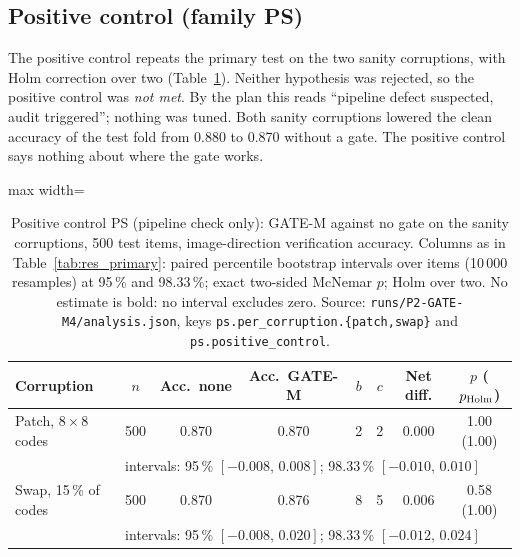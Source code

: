 \subsection{Positive control (family PS)}\label{ssec:res_ps}
The positive control repeats the primary test on the two sanity corruptions, with Holm correction over two (Table~\ref{tab:res_ps}).
Neither hypothesis was rejected, so the positive control was \emph{not met}.
By the plan this reads ``pipeline defect suspected, audit triggered''; nothing was tuned.
Both sanity corruptions lowered the clean accuracy of the test fold from 0.880 to 0.870 without a gate.
The positive control says nothing about where the gate works.

\begin{table}[!tbp]
\centering
\caption{Positive control PS (pipeline check only): GATE-M against no gate on the sanity corruptions, 500 test items, image-direction
verification accuracy. Columns as in Table~\ref{tab:res_primary}: paired percentile bootstrap intervals over items (10\,000
resamples) at 95\,\% and 98.33\,\%; exact two-sided McNemar $p$; Holm over two. No estimate is bold: no interval excludes zero. Source:
\nolinkurl{runs/P2-GATE-M4/analysis.json}, keys \nolinkurl{ps.per_corruption.{patch,swap}} and \nolinkurl{ps.positive_control}.}
\label{tab:res_ps}
\footnotesize
\begin{adjustbox}{max width=\textwidth}
\begin{tabular}{lccccccc}
\toprule
Corruption & $n$ & Acc.\ none & Acc.\ GATE-M & $b$ & $c$ & Net diff. & $p$ ($p_{\rm Holm}$) \\
\midrule
Patch, $8\times8$ codes & 500 & 0.870 & 0.870 & 2 & 2 & $0.000$ & 1.00 (1.00) \\
& \multicolumn{7}{l}{\scriptsize intervals: 95\,\% $[-0.008,\,0.008]$; 98.33\,\% $[-0.010,\,0.010]$} \\
Swap, 15\,\% of codes & 500 & 0.870 & 0.876 & 8 & 5 & $0.006$ & 0.58 (1.00) \\
& \multicolumn{7}{l}{\scriptsize intervals: 95\,\% $[-0.008,\,0.020]$; 98.33\,\% $[-0.012,\,0.024]$} \\
\bottomrule
\end{tabular}
\end{adjustbox}
\end{table}

